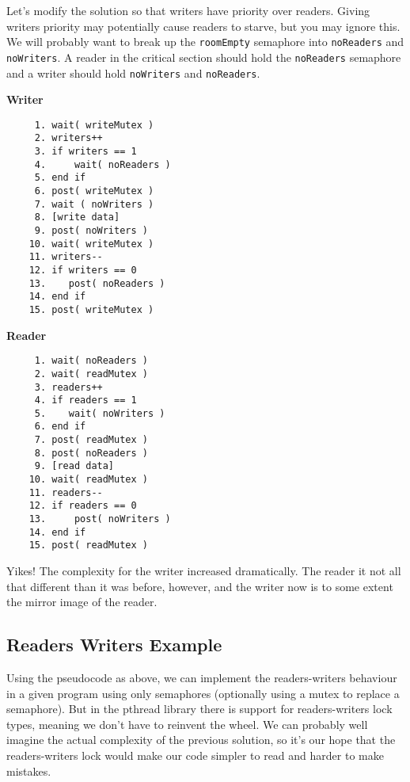 Let's modify the solution so that writers have priority over readers. Giving writers priority may potentially cause readers to starve, but you may ignore this. We will probably want to break up the \texttt{roomEmpty} semaphore into \texttt{noReaders} and \texttt{noWriters}. A reader in the critical section should hold the \texttt{noReaders} semaphore and a writer should hold \texttt{noWriters} and \texttt{noReaders}. 

\begin{multicols}{2}
\textbf{Writer}\vspace{-1em}
  \begin{verbatim}
     1. wait( writeMutex )
     2. writers++
     3. if writers == 1
     4.     wait( noReaders )
     5. end if
     6. post( writeMutex )
     7. wait ( noWriters )
     8. [write data]
     9. post( noWriters ) 
    10. wait( writeMutex )
    11. writers--
    12. if writers == 0
    13.    post( noReaders )
    14. end if
    15. post( writeMutex )     
  \end{verbatim}
\columnbreak
\textbf{Reader}\vspace{-2em}
  \begin{verbatim}
     1. wait( noReaders )
     2. wait( readMutex )
     3. readers++
     4. if readers == 1
     5.    wait( noWriters )
     6. end if
     7. post( readMutex )
     8. post( noReaders )
     9. [read data]
    10. wait( readMutex )
    11. readers--
    12. if readers == 0
    13.     post( noWriters )
    14. end if
    15. post( readMutex )
\end{verbatim}
\end{multicols}
\vspace{-2em}

Yikes! The complexity for the writer increased dramatically. The reader it not all that different than it was before, however, and the writer now is to some extent the mirror image of the reader. 

\subsection*{Readers Writers Example} 
Using the pseudocode as above, we can implement the readers-writers behaviour in a given program using only semaphores (optionally using a mutex to replace a semaphore). But in the pthread library there is support for readers-writers lock types, meaning we don't have to reinvent the wheel. We can probably well imagine the actual complexity of the previous solution, so it's our hope that the readers-writers lock would make our code simpler to read and harder to make mistakes.

